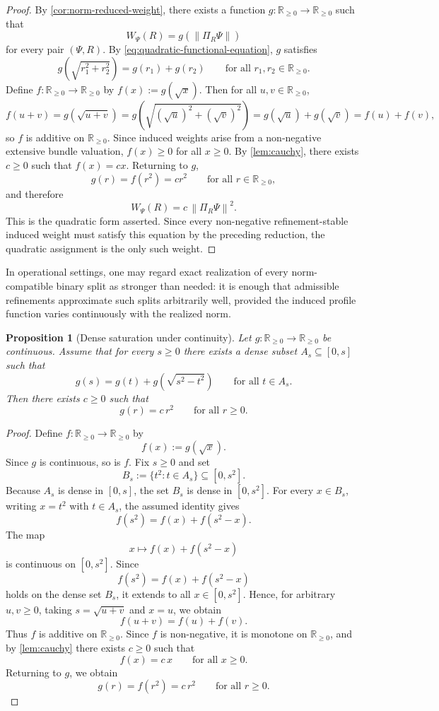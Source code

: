 \documentclass[11pt]{article}
\newtheorem{proposition}{Proposition}
\theoremstyle{remark}
\numberwithin{equation}{section}
\newcommand{\RR}{\mathbb{R}}
\newcommand{\Wpsi}[1]{W_{\Psi}\!\left(#1\right)}
\newcommand{\Proj}[1]{\Pi_{#1}}
\newcommand{\norm}[1]{\left\lVert #1 \right\rVert}
\begin{document}
\begin{proof}
By \cref{cor:norm-reduced-weight}, there exists a function
$g : \RR_{\geq 0} \to \RR_{\geq 0}$ such that
\[
  \Wpsi{R} = g\!\left(\norm{\Proj{R}\Psi}\right)
\]
for every pair $(\Psi, R)$. By \cref{eq:quadratic-functional-equation},
$g$ satisfies
\[
  g\!\left(\sqrt{r_1^2 + r_2^2}\right) = g(r_1) + g(r_2)
  \qquad \text{for all } r_1, r_2 \in \RR_{\geq 0}.
\]
Define $f : \RR_{\geq 0} \to \RR_{\geq 0}$ by $f(x) := g(\sqrt{x})$.
Then for all $u, v \in \RR_{\geq 0}$,
\[
  f(u + v)
  = g\!\left(\sqrt{u + v}\right)
  = g\!\left(\sqrt{(\sqrt{u})^2 + (\sqrt{v})^2}\right)
  = g(\sqrt{u}) + g(\sqrt{v})
  = f(u) + f(v),
\]
so $f$ is additive on $\RR_{\geq 0}$. Since induced weights arise from
a non-negative extensive bundle valuation, $f(x) \geq 0$ for all
$x \geq 0$. By \cref{lem:cauchy}, there exists $c \geq 0$ such that
$f(x) = cx$.
Returning to $g$,
\[
  g(r) = f(r^2) = cr^2 \qquad \text{for all } r \in \RR_{\geq 0},
\]
and therefore
\[
  \Wpsi{R} = c\,\norm{\Proj{R}\Psi}^2.
\]
This is the quadratic form asserted. Since every non-negative
refinement-stable induced weight must satisfy this equation by the
preceding reduction, the quadratic assignment is the only such weight.
\end{proof}

In operational settings, one may regard exact realization of every norm-compatible binary split as stronger than needed: it is enough that admissible refinements approximate such splits arbitrarily well, provided the induced profile function varies continuously with the realized norm.

\begin{proposition}[Dense saturation under continuity]
\label{prop:dense-saturation}
Let $g:\RR_{\geq 0}\to\RR_{\geq 0}$ be continuous. Assume that for every $s\ge 0$ there exists a dense subset $A_s\subseteq[0,s]$ such that
\[
g(s)=g(t)+g\!\left(\sqrt{s^{2}-t^{2}}\right)
\qquad\text{for all } t\in A_s .
\]
Then there exists $c\ge 0$ such that
\[
g(r)=c\,r^{2}
\qquad\text{for all } r\ge 0.
\]
\end{proposition}

\begin{proof}
Define $f:\RR_{\geq 0}\to\RR_{\geq 0}$ by
\[
f(x):=g(\sqrt{x}).
\]
Since $g$ is continuous, so is $f$. Fix $s\ge 0$ and set
\[
B_s:=\{t^{2}: t\in A_s\}\subseteq [0,s^{2}].
\]
Because $A_s$ is dense in $[0,s]$, the set $B_s$ is dense in $[0,s^{2}]$. For every $x\in B_s$, writing $x=t^{2}$ with $t\in A_s$, the assumed identity gives
\[
f(s^{2})=f(x)+f(s^{2}-x).
\]
The map
\[
x \mapsto f(x)+f(s^{2}-x)
\]
is continuous on $[0,s^{2}]$. Since
\[
f(s^{2})=f(x)+f(s^{2}-x)
\]
holds on the dense set $B_s$, it extends to all $x\in[0,s^{2}]$.
Hence, for arbitrary $u,v\ge 0$, taking $s=\sqrt{u+v}$ and $x=u$, we obtain
\[
f(u+v)=f(u)+f(v).
\]
Thus $f$ is additive on $\RR_{\geq 0}$. Since $f$ is non-negative, it is monotone on $\RR_{\geq 0}$, and by \cref{lem:cauchy} there exists $c\ge 0$ such that
\[
f(x)=c\,x
\qquad\text{for all } x\ge 0.
\]
Returning to $g$, we obtain
\[
g(r)=f(r^{2})=c\,r^{2}
\qquad\text{for all } r\ge 0.
\]
\end{proof}
\end{document}

